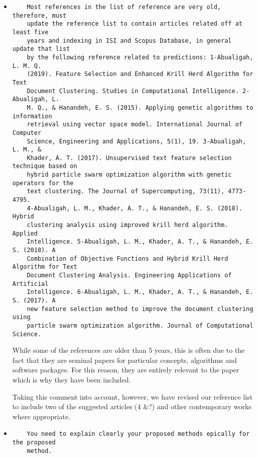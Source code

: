 \documentclass[11pt]{article}
\begin{document}
\begin{itemize}

\item
\begin{verbatim}
    Most references in the list of reference are very old, therefore, must
    update the reference list to contain articles related off at least five
    years and indexing in ISI and Scopus Database, in general update that list
    by the following reference related to predictions: 1-Abualigah, L. M. Q.
    (2019). Feature Selection and Enhanced Krill Herd Algorithm for Text
    Document Clustering. Studies in Computational Intelligence. 2-Abualigah, L.
    M. Q., & Hanandeh, E. S. (2015). Applying genetic algorithms to information
    retrieval using vector space model. International Journal of Computer
    Science, Engineering and Applications, 5(1), 19. 3-Abualigah, L. M., &
    Khader, A. T. (2017). Unsupervised text feature selection technique based on
    hybrid particle swarm optimization algorithm with genetic operators for the
    text clustering. The Journal of Supercomputing, 73(11), 4773-4795.
    4-Abualigah, L. M., Khader, A. T., & Hanandeh, E. S. (2018). Hybrid
    clustering analysis using improved krill herd algorithm. Applied
    Intelligence. 5-Abualigah, L. M., Khader, A. T., & Hanandeh, E. S. (2018). A
    Combination of Objective Functions and Hybrid Krill Herd Algorithm for Text
    Document Clustering Analysis. Engineering Applications of Artificial
    Intelligence. 6-Abualigah, L. M., Khader, A. T., & Hanandeh, E. S. (2017). A
    new feature selection method to improve the document clustering using
    particle swarm optimization algorithm. Journal of Computational Science.
\end{verbatim}

While some of the references are older than 5 years, this is often due to the
fact that they are seminal papers for particular concepts, algorithms and
software packages. For this reason, they are entirely relevant to the paper
which is why they have been included.

Taking this comment into account, however, we have revised our reference list to
include two of the suggested articles (4 \&?) and other contemporary works
where appropriate.


\item
\begin{verbatim}
    You need to explain clearly your proposed methods epically for the proposed
    method.


\end{verbatim}
\end{itemize}
\end{document}
